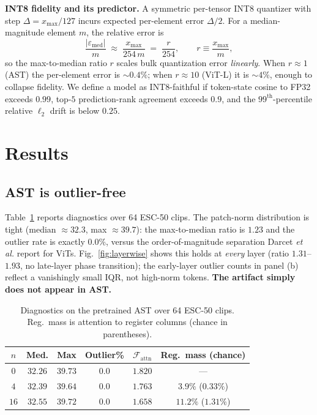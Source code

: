 \documentclass[conference]{IEEEtran}
\begin{document}
\textbf{INT8 fidelity and its predictor.} A symmetric per-tensor INT8 quantizer with step $\Delta = x_{\max}/127$ incurs expected per-element error $\Delta/2$. For a median-magnitude element $m$, the relative error is
\begin{equation}
\frac{|\varepsilon_{\text{med}}|}{m}\;\approx\;\frac{x_{\max}}{254\,m}\;=\;\frac{r}{254},
\qquad r \equiv \frac{x_{\max}}{m},
\label{eq:r}
\end{equation}
so the max-to-median ratio $r$ scales bulk quantization error \emph{linearly}. When $r\!\approx\!1$ (AST) the per-element error is $\sim\!0.4\%$; when $r\!\approx\!10$ (ViT-L) it is $\sim\!4\%$, enough to collapse fidelity. We define a model as INT8-faithful if token-state cosine to FP32 exceeds $0.99$, top-$5$ prediction-rank agreement exceeds $0.9$, and the $99^{\text{th}}$-percentile relative $\ell_2$ drift is below $0.25$.

\section{Results}
\subsection{AST is outlier-free}
Table~\ref{tab:diag} reports diagnostics over 64 ESC-50 clips. The patch-norm distribution is tight (median $\approx 32.3$, max $\approx 39.7$): the max-to-median ratio is $1.23$ and the outlier rate is exactly $0.0\%$, versus the order-of-magnitude separation Darcet \emph{et al.} report for ViTs. Fig.~\ref{fig:layerwise} shows this holds at \emph{every} layer (ratio $1.31$--$1.93$, no late-layer phase transition); the early-layer outlier counts in panel (b) reflect a vanishingly small IQR, not high-norm tokens. \textbf{The artifact simply does not appear in AST.}

\begin{table}[t]
\caption{Diagnostics on the pretrained AST over 64 ESC-50 clips. Reg.\ mass is attention to register columns (chance in parentheses).}
\label{tab:diag}
\centering\renewcommand{\arraystretch}{1.12}\setlength{\tabcolsep}{4pt}
\begin{tabular}{cccccc}
\toprule
$n$ & Med. & Max & Outlier\% & $\mathcal{F}_{\text{attn}}$ & Reg.\ mass (chance)\\
\midrule
$0$ & $32.26$ & $39.73$ & $0.0$ & $1.820$ & ---\\
$4$ & $32.39$ & $39.64$ & $0.0$ & $1.763$ & $3.9\%$ ($0.33\%$)\\
$16$ & $32.55$ & $39.72$ & $0.0$ & $1.658$ & $11.2\%$ ($1.31\%$)\\
\bottomrule
\end{tabular}
\end{table}
\end{document}
